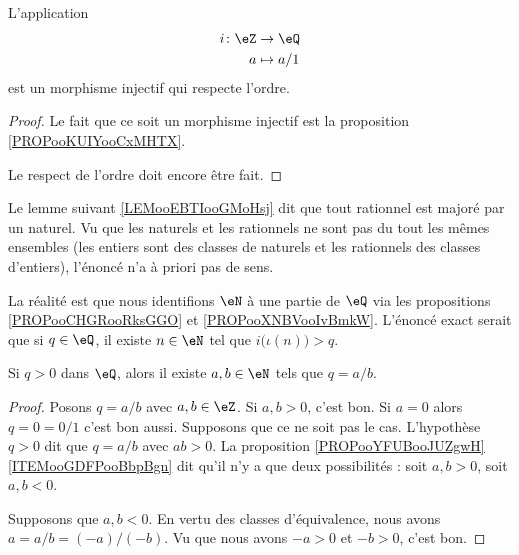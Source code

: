 \begin{proposition}	\label{PROPooXNBVooIvBmkW}
	L'application
	\begin{equation}
		\begin{aligned}
			i\colon \eZ & \to \eQ     \\
			a           & \mapsto a/1
		\end{aligned}
	\end{equation}
	est un morphisme injectif qui respecte l'ordre.
\end{proposition}

\begin{proof}
	Le fait que ce soit un morphisme injectif est la proposition \ref{PROPooKUIYooCxMHTX}.

	Le respect de l'ordre doit encore être fait.
\end{proof}

\begin{normaltext}
	Le lemme suivant \ref{LEMooEBTIooGMoHsj} dit que tout rationnel est majoré par un naturel. Vu que les naturels et les rationnels ne sont pas du tout les mêmes ensembles (les entiers sont des classes de naturels et les rationnels des classes d'entiers), l'énoncé n'a à priori pas de sens.

	La réalité est que nous identifions \( \eN\) à une partie de \( \eQ\) via les propositions \ref{PROPooCHGRooRksGGO} et \ref{PROPooXNBVooIvBmkW}. L'énoncé exact serait que si \( q\in \eQ\), il existe \( n\in \eN\) tel que \( i\big( \iota(n) \big)> q\).
\end{normaltext}

\begin{proposition}	\label{PROPooTEREooZgblWu}
	Si \( q>0\) dans \( \eQ\), alors il existe \( a,b\in \eN\) tels que \( q=a/b\).
\end{proposition}

\begin{proof}
	Posons \( q=a/b\) avec \( a,b\in \eZ\). Si \( a,b>0\), c'est bon. Si \( a=0\) alors \( q=0=0/1\) c'est bon aussi. Supposons que ce ne soit pas le cas. L'hypothèse \( q>0\) dit que \( q=a/b\) avec \( ab>0\). La proposition \ref{PROPooYFUBooJUZgwH}\ref{ITEMooGDFPooBbpBgn} dit qu'il n'y a que deux possibilités : soit \( a,b>0\), soit \( a,b<0\).

	Supposons que \( a,b<0\). En vertu des classes d'équivalence, nous avons \( a=a/b=(-a)/(-b)\). Vu que nous avons \( -a>0\) et \( -b>0\), c'est bon.
\end{proof}


